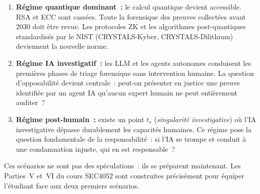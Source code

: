 \begin{enumerate}
    \item \textbf{Régime quantique dominant~:} le calcul quantique devient
          accessible. RSA et ECC sont cassées. Toute la forensique des preuves
          collectées avant 2030 doit être revue. Les protocoles ZK et les
          algorithmes post-quantiques standardisés par le NIST (CRYSTALS-Kyber,
          CRYSTALS-Dilithium) deviennent la nouvelle norme.

    \item \textbf{Régime IA investigatif~:} les LLM et les agents autonomes
          conduisent les premières phases de triage forensique sans intervention
          humaine. La question d'opposabilité devient centrale~: peut-on présenter
          en justice une preuve identifiée par un agent IA qu'aucun expert humain
          ne peut entièrement auditer~?

    \item \textbf{Régime post-humain~:} existe un point $t_s$ (\textit{singularité
          investigative}) où l'IA investigative dépasse durablement les capacités
          humaines. Ce régime pose la question fondamentale de la responsabilité~:
          si l'IA se trompe et conduit à une condamnation injuste, qui en est
          responsable~?
\end{enumerate}

\medskip

Ces scénarios ne sont pas des spéculations~: ils se préparent maintenant.
Les Parties~V et~VI du cours SEC4052 sont construites précisément pour équiper
l'étudiant face aux deux premiers scénarios.

\separateur

